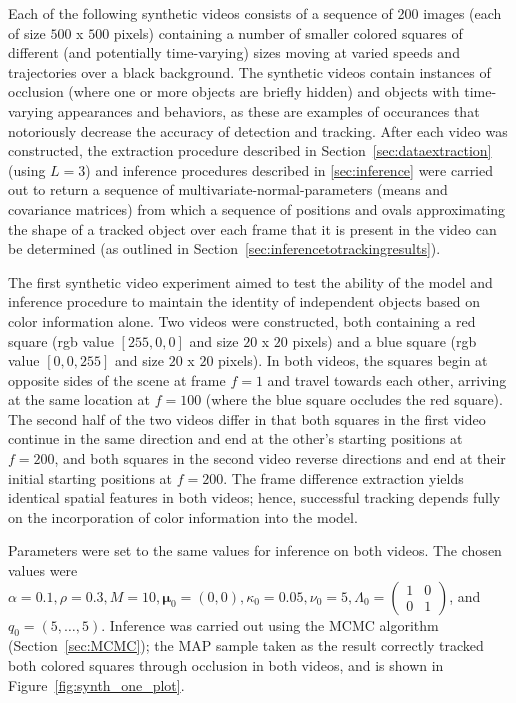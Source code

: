 \documentclass{article}
\begin{document}
Each of the following synthetic videos consists of a sequence of 200 images (each of size $500$ x $500$ pixels) containing a number of smaller colored squares of different (and potentially time-varying) sizes moving at varied speeds and trajectories over a black background. The synthetic videos contain instances of occlusion (where one or more objects are briefly hidden) and objects with time-varying appearances and behaviors, as these are examples of occurances that notoriously decrease the accuracy of detection and tracking. After each video was constructed, the extraction procedure described in Section~\ref{sec:dataextraction} (using $L=3$) and inference procedures described in \ref{sec:inference} were carried out to return a sequence of multivariate-normal-parameters (means and covariance matrices) from which a sequence of positions and ovals approximating the shape of a tracked object over each frame that it is present in the video can be determined (as outlined in Section~\ref{sec:inferencetotrackingresults}).

The first synthetic video experiment aimed to test the ability of the model and inference procedure to maintain the identity of independent objects based on color information alone. Two videos were constructed, both containing a red square (rgb value $[255,0,0]$ and size $20$ x $20$ pixels) and a blue square (rgb value $[0,0,255]$ and size $20$ x $20$ pixels). In both videos, the squares begin at opposite sides of the scene at frame $f=1$ and travel towards each other, arriving at the same location at $f=100$ (where the blue square occludes the red square). The second half of the two videos differ in that both squares in the first video continue in the same direction and end at the other's starting positions at $f=200$, and both squares in the second video reverse directions and end at their initial starting positions at $f=200$. The frame difference extraction yields identical spatial features in both videos; hence, successful tracking depends fully on the incorporation of color information into the model.

Parameters were set to the same values for inference on both videos. The chosen values were $\alpha = 0.1, \rho = 0.3, M = 10, \boldsymbol{\mu}_{0} = (0,0), \kappa_{0} = 0.05, \nu_{0} = 5, \Lambda_{0} = \left( \begin{smallmatrix} 1&0\\ 0&1 \end{smallmatrix} \right)$, and $q_{0} = (5, \ldots, 5)$. Inference was carried out using the MCMC algorithm (Section~\ref{sec:MCMC}); the MAP sample taken as the result correctly tracked both colored squares through occlusion in both videos, and is shown in Figure~\ref{fig:synth_one_plot}. 
\end{document}

